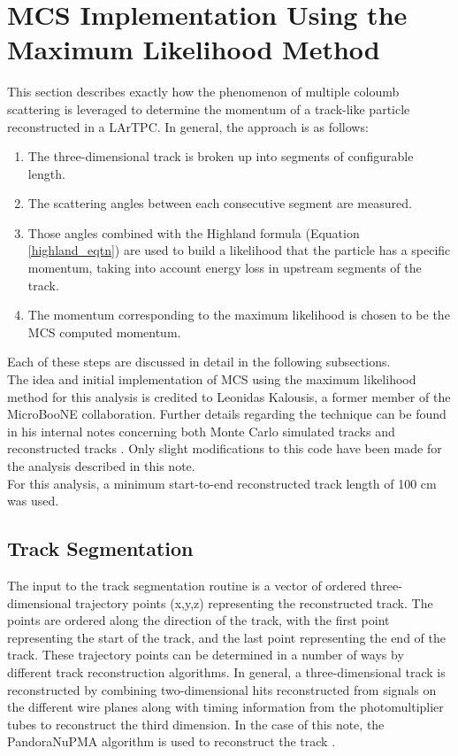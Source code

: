 \section{MCS Implementation Using the Maximum Likelihood Method}\label{MCS_technique_section}

This section describes exactly how the phenomenon of multiple coloumb scattering is leveraged to determine the momentum of a track-like particle reconstructed in a LArTPC. In general, the approach is as follows:
\begin{enumerate}
\item The three-dimensional track is broken up into segments of configurable length.
\item The scattering angles between each consecutive segment are measured.
\item Those angles combined with the Highland formula (Equation \ref{highland_eqtn}) are used to build a likelihood that the particle has a specific momentum, taking into account energy loss in upstream segments of the track.
\item The momentum corresponding to the maximum likelihood is chosen to be the MCS computed momentum.
\end{enumerate}
Each of these steps are discussed in detail in the following subsections.\\

The idea and initial implementation of MCS using the maximum likelihood method for this analysis is credited to Leonidas Kalousis, a former member of the MicroBooNE collaboration. Further details regarding the technique can be found in his internal notes concerning both Monte Carlo simulated tracks \cite{leonidas1} and reconstructed tracks \cite{leonidas2}. Only slight modifications to this code have been made for the analysis described in this note.\\

For this analysis, a minimum start-to-end reconstructed track length of 100 cm was used.%

\subsection{Track Segmentation}\label{track_segmentation_section}
The input to the track segmentation routine is a vector of ordered three-dimensional trajectory points (x,y,z) representing the reconstructed track. The points are ordered along the direction of the track, with the first point representing the start of the track, and the last point representing the end of the track. These trajectory points can be determined in a number of ways by different track reconstruction algorithms. In general, a three-dimensional track is reconstructed by combining two-dimensional hits reconstructed from signals on the different wire planes along with timing information from the photomultiplier tubes to reconstruct the third dimension. In the case of this note, the PandoraNuPMA algorithm is used to reconstruct the track \cite{Marshall:2015rfa}.\\

